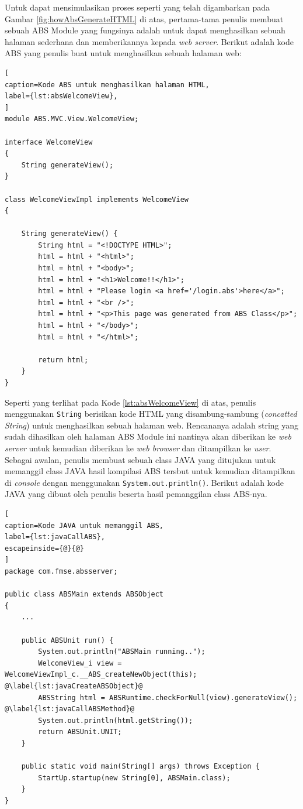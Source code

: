 Untuk dapat mensimulasikan proses seperti yang telah digambarkan pada Gambar \ref{fig:howAbsGenerateHTML} di atas, pertama-tama penulis membuat sebuah ABS Module yang fungsinya adalah untuk dapat menghasilkan sebuah halaman sederhana dan memberikannya kepada \textit{web server}. Berikut adalah kode ABS yang penulis buat untuk menghasilkan sebuah halaman web:

\begin{lstlisting}[
caption=Kode ABS untuk menghasilkan halaman HTML,
label={lst:absWelcomeView},
]
module ABS.MVC.View.WelcomeView;

interface WelcomeView
{
	String generateView();
}

class WelcomeViewImpl implements WelcomeView
{
	
	String generateView() {		
		String html = "<!DOCTYPE HTML>";
		html = html + "<html>";
		html = html + "<body>";
		html = html + "<h1>Welcome!!</h1>";
		html = html + "Please login <a href='/login.abs'>here</a>";
		html = html + "<br />";
		html = html + "<p>This page was generated from ABS Class</p>";
		html = html + "</body>";
		html = html + "</html>";
		
		return html;
	}
}
\end{lstlisting}

Seperti yang terlihat pada Kode \ref{lst:absWelcomeView} di atas, penulis menggunakan \texttt{String} berisikan kode HTML yang disambung-sambung (\textit{concatted String}) untuk menghasilkan sebuah halaman web. Rencananya adalah string yang sudah dihasilkan oleh halaman ABS Module ini nantinya akan diberikan ke \textit{web server} untuk kemudian diberikan ke \textit{web browser} dan ditampilkan ke \textit{user}. Sebagai awalan, penulis membuat sebuah class JAVA yang ditujukan untuk memanggil class JAVA hasil kompilasi ABS tersbut untuk kemudian ditampilkan di \textit{console} dengan menggunakan \texttt{System.out.println()}. Berikut adalah kode JAVA yang dibuat oleh penulis beserta hasil pemanggilan class ABS-nya.

\begin{lstlisting}[
caption=Kode JAVA untuk memanggil ABS,
label={lst:javaCallABS},
escapeinside={@}{@}
]
package com.fmse.absserver;

public class ABSMain extends ABSObject 
{
    ...
       
    public ABSUnit run() {
        System.out.println("ABSMain running..");
        WelcomeView_i view = WelcomeViewImpl_c.__ABS_createNewObject(this); @\label{lst:javaCreateABSObject}@
        ABSString html = ABSRuntime.checkForNull(view).generateView(); @\label{lst:javaCallABSMethod}@
        System.out.println(html.getString());
        return ABSUnit.UNIT; 
    }
    
    public static void main(String[] args) throws Exception {
        StartUp.startup(new String[0], ABSMain.class);
    }
}
\end{lstlisting}

